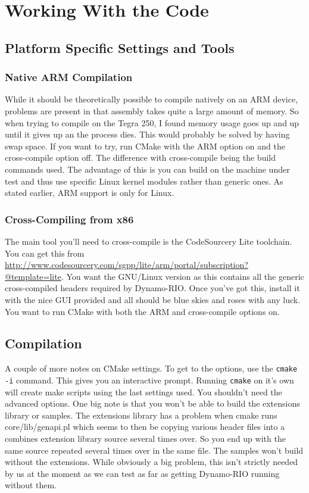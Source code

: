 \documentclass[a4paper]{article}
\begin{document}
\section{Working With the Code}
\subsection{Platform Specific Settings and Tools}
\subsubsection{Native ARM Compilation}
While it should be theoretically possible to compile natively on an ARM device,
problems are present in that assembly takes quite a large amount of memory. So
when trying to compile on the Tegra 250, I found memory usage goes up and up
until it gives up an the process dies. This would probably be solved by having
swap space. If you want to try, run CMake with the ARM option on and the
cross-compile option off. The difference with cross-compile being the build
commands used. The advantage of this is you can build on the machine under test
and thus use specific Linux kernel modules rather than generic ones. As stated
earlier, ARM support is only for Linux.

\subsubsection{Cross-Compiling from x86}
The main tool you'll need to cross-compile is the CodeSourcery Lite toolchain.
You can get this from
\url{http://www.codesourcery.com/sgpp/lite/arm/portal/subscription?@template=lite}.
You want the GNU/Linux version as this contains all the generic cross-compiled
headers required by Dynamo-RIO. Once you've got this, install it with the nice
GUI provided and all should be blue skies and roses with any luck. You want to
run CMake with both the ARM and cross-compile options on. 

\subsection{Compilation}
A couple of more notes on CMake settings. To get to the options, use the
\texttt{cmake -i} command. This gives you an interactive prompt. Running
\texttt{cmake} on it's own will create make scripts using the last settings
used. You shouldn't need the advanced options. One big note is that you won't be
able to build the extensions library or samples. The extensions library has a
problem when cmake runs core/lib/genapi.pl which seems to then be copying
various header files into a combines extension library source several times
over. So you end up with the same source repeated several times over in the same
file. The samples won't build without the extensions. While obviously a big
problem, this isn't strictly needed by us at the moment as we can test as far
as getting Dynamo-RIO running without them.
\end{document}
